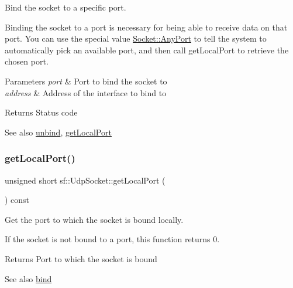 Bind the socket to a specific port. 

Binding the socket to a port is necessary for being able to receive data on that port. You can use the special value \hyperlink{classsf_1_1_socket_a478fc5d82347df37c24f10c32de8cca7a5a3c30fd128895403afc11076f461b19}{Socket\+::\+Any\+Port} to tell the system to automatically pick an available port, and then call get\+Local\+Port to retrieve the chosen port.


\begin{DoxyParams}{Parameters}
{\em port} & Port to bind the socket to \\
\hline
{\em address} & Address of the interface to bind to\\
\hline
\end{DoxyParams}
\begin{DoxyReturn}{Returns}
Status code
\end{DoxyReturn}
\begin{DoxySeeAlso}{See also}
\hyperlink{classsf_1_1_udp_socket_a2c4abb8102a1bd31f51fcfe7f15427a3}{unbind}, \hyperlink{classsf_1_1_udp_socket_a5c03644b3da34bb763bce93e758c938e}{get\+Local\+Port} 
\end{DoxySeeAlso}
\mbox{\label{classsf_1_1_udp_socket_a5c03644b3da34bb763bce93e758c938e}} 
\subsubsection{\texorpdfstring{get\+Local\+Port()}{getLocalPort()}}
{\footnotesize\ttfamily unsigned short sf\+::\+Udp\+Socket\+::get\+Local\+Port (\begin{DoxyParamCaption}{ }\end{DoxyParamCaption}) const}



Get the port to which the socket is bound locally. 

If the socket is not bound to a port, this function returns 0.

\begin{DoxyReturn}{Returns}
Port to which the socket is bound
\end{DoxyReturn}
\begin{DoxySeeAlso}{See also}
\hyperlink{classsf_1_1_udp_socket_ad764c3d06d90b4714dcc97a0d1647bcc}{bind} 
\end{DoxySeeAlso}
\mbox{\label{classsf_1_1_udp_socket_ade9ca0f7ed7919136917b0b997a9833a}} 
